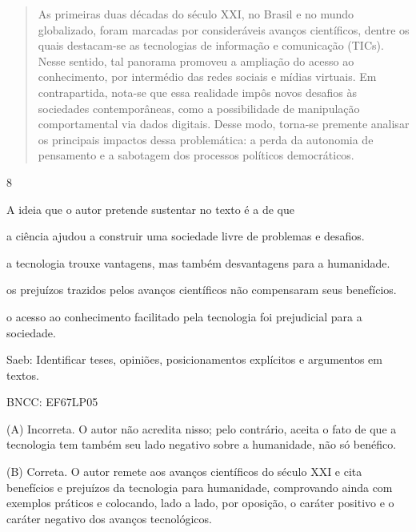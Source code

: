 \begin{quote}
As primeiras duas décadas do século XXI, no Brasil e no mundo
globalizado, foram marcadas por consideráveis avanços científicos,
dentre os quais destacam-se as tecnologias de informação e comunicação
(TICs). Nesse sentido, tal panorama promoveu a ampliação do acesso ao
conhecimento, por intermédio das redes sociais e mídias virtuais. Em
contrapartida, nota-se que essa realidade impôs novos desafios às
sociedades contemporâneas, como a possibilidade de manipulação
comportamental via dados digitais. Desse modo, torna-se premente
analisar os principais impactos dessa problemática: a perda da autonomia
de pensamento e a sabotagem dos processos políticos democráticos.
\end{quote}


\num{8}

A ideia que o autor pretende sustentar no texto é a de que

\begin{escolha}
\item a ciência ajudou a construir uma sociedade livre de problemas e
desafios.

\item a tecnologia trouxe vantagens, mas também desvantagens para a
humanidade.

\item os prejuízos trazidos pelos avanços científicos não compensaram seus
benefícios.

\item o acesso ao conhecimento facilitado pela tecnologia foi prejudicial
para a sociedade.
\end{escolha}

Saeb: Identificar teses, opiniões, posicionamentos explícitos e
argumentos em textos.

BNCC: EF67LP05

(A) Incorreta. O autor não acredita nisso; pelo contrário, aceita o fato
de que a tecnologia tem também seu lado negativo sobre a humanidade, não
só benéfico.

(B) Correta. O autor remete aos avanços científicos do século XXI e cita
benefícios e prejuízos da tecnologia para humanidade, comprovando ainda
com exemplos práticos e colocando, lado a lado, por oposição, o caráter
positivo e o caráter negativo dos avanços tecnológicos.

